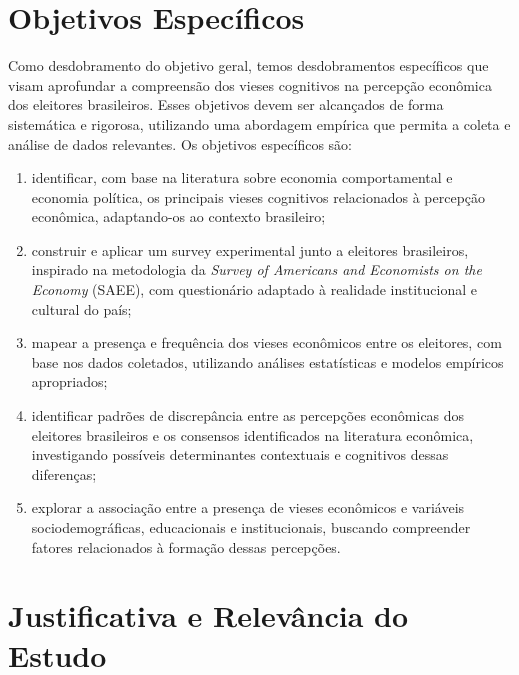 \section{Objetivos Específicos}\label{sec:objetivos-especificos}


Como desdobramento do objetivo geral, temos desdobramentos específicos que visam aprofundar a compreensão dos vieses cognitivos na percepção econômica dos eleitores brasileiros. Esses objetivos devem ser alcançados de forma sistemática e rigorosa, utilizando uma abordagem empírica que permita a coleta e análise de dados relevantes. Os objetivos específicos são:

\begin{enumerate}[label=\alph*)]
    \item \label{obj:a} identificar, com base na literatura sobre economia comportamental e economia política, os principais vieses cognitivos relacionados à percepção econômica, adaptando-os ao contexto brasileiro;

    \item \label{obj:b} construir e aplicar um survey experimental junto a eleitores brasileiros, inspirado na metodologia da \textit{Survey of Americans and Economists on the Economy} (SAEE), com questionário adaptado à realidade institucional e cultural do país;

    \item \label{obj:c} mapear a presença e frequência dos vieses econômicos entre os eleitores, com base nos dados coletados, utilizando análises estatísticas e modelos empíricos apropriados;

    \item \label{obj:d} identificar padrões de discrepância entre as percepções econômicas dos eleitores brasileiros e os consensos identificados na literatura econômica, investigando possíveis determinantes contextuais e cognitivos dessas diferenças;

    \item \label{obj:e} explorar a associação entre a presença de vieses econômicos e variáveis sociodemográficas, educacionais e institucionais, buscando compreender fatores relacionados à formação dessas percepções.
\end{enumerate}


\section{Justificativa e Relevância do Estudo}

